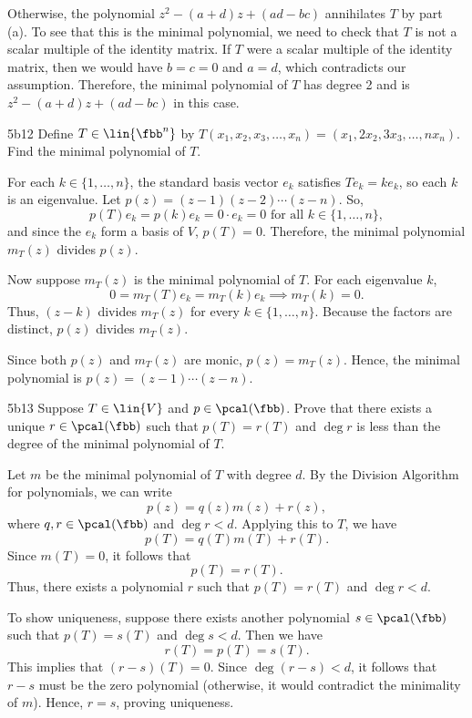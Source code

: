 \begin{solenum}
    Otherwise, the polynomial $z^2 - (a + d)z + (ad - bc)$ annihilates $T$ by part (a).
    To see that this is the minimal polynomial, we need to check that $T$ is not a scalar multiple of the identity matrix.
    If $T$ were a scalar multiple of the identity matrix, then we would have $b = c = 0$ and $a = d$, which contradicts our assumption.
    Therefore, the minimal polynomial of $T$ has degree 2 and is $z^2 - (a + d)z + (ad - bc)$ in this case.
\end{solenum}

\begin{exercise}{5b12}
    Define $T \in \lin{\fbb^n}$ by $T(x_1, x_2, x_3, \ldots, x_n) = (x_1, 2x_2, 3x_3, \ldots, nx_n)$.
	Find the minimal polynomial of $T$.
\end{exercise}

\begin{sol}
    For each $k \in \{1, \dots, n\}$, the standard basis vector $e_k$ satisfies $Te_k=ke_k$, so each $k$ is an eigenvalue. Let $p(z)=(z-1)(z-2) \cdots (z-n)$. So,
    \[
    	p(T) e_k=p(k) e_k=0 \cdot e_k=0 \text{ for all } k \in \{1, \dots, n\},
    \]
    and since the $e_k$ form a basis of $V$, $p(T)=0$. Therefore, the minimal polynomial $m_T (z)$ divides $p(z)$.

    Now suppose $m_T (z)$ is the minimal polynomial of $T$. For each eigenvalue $k$,
    \[
    	0=m_T (T) e_k=m_T (k) e_k \implies m_T (k)=0.
    \]
    Thus, $(z-k)$ divides $m_T (z)$ for every $k \in \{1, \dots, n\}$. Because the factors are distinct, $p(z)$ divides $m_T (z)$.

    Since both $p(z)$ and $m_T (z)$ are monic, $p(z)=m_T (z)$. Hence, the minimal polynomial is $p(z)=(z-1) \cdots (z-n)$.
\end{sol}

\begin{exercise}{5b13}
    Suppose $T \in \lin{V}$ and $p \in \pcal(\fbb)$.
	Prove that there exists a unique $r \in \pcal(\fbb)$ such that $p(T) = r(T)$ and $\deg r$ is less than the degree of the minimal polynomial of $T$.
\end{exercise}

\begin{sol}
    Let $m$ be the minimal polynomial of $T$ with degree $d$.
    By the Division Algorithm for polynomials, we can write
    \[
    	p(z) = q(z)m(z) + r(z),
    \]
    where $q, r \in \pcal(\fbb)$ and $\deg r < d$.
    Applying this to $T$, we have
    \[
    	p(T) = q(T)m(T) + r(T).
    \]
    Since $m(T) = 0$, it follows that
    \[
    	p(T) = r(T).
    \]
    Thus, there exists a polynomial $r$ such that $p(T) = r(T)$ and $\deg r < d$.

    To show uniqueness, suppose there exists another polynomial $s \in \pcal(\fbb)$ such that $p(T) = s(T)$ and $\deg s < d$.
    Then we have
    \[
    	r(T) = p(T) = s(T).
    \]
    This implies that $(r - s)(T) = 0$.
    Since $\deg(r - s) < d$, it follows that $r - s$ must be the zero polynomial (otherwise, it would contradict the minimality of $m$).
    Hence, $r = s$, proving uniqueness.
\end{sol}

